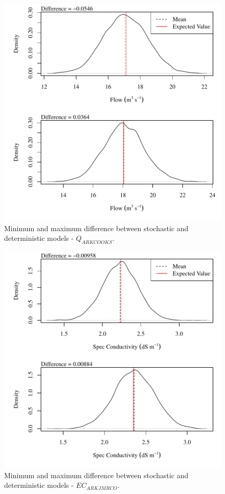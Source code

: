 \begin{center}
\begin{figure}[htbp]
	\includegraphics[width=6in]{"Figures/Results_DSR/V min-max diff qout"}
	\caption{Minimum and maximum difference between stochastic and deterministic models - $Q_{ARKCOOKS}$.}
\end{figure}
\end{center}
\newpage

\begin{center}
\begin{figure}[htbp]
	\includegraphics[width=6in]{"Figures/Results_DSR/V min-max diff ecin"}
	\caption{Minimum and maximum difference between stochastic and deterministic models - $EC_{ARKJMRCO}$.}
\end{figure}
\end{center}
\newpage

